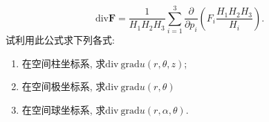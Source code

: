 \begin{enumerate}
$$\mathrm{div}\bm{F}=\frac{1}{H_1H_2H_3}\sum\limits_{i=1}^{3}\frac{\partial }{\partial p_i}(F_i\frac{H_1H_2H_3}{H_i}).$$
试利用此公式求下列各式:
\begin{enumerate}
	\item 在空间柱坐标系, 求$\mathrm{div}\ \mathrm{grad}u(r,\theta,z)$;
	\item 在空间极坐标系, 求$\mathrm{div}\ \mathrm{grad}u(r,\theta)$
	\item 在空间球坐标系, 求$\mathrm{div}\ \mathrm{grad}u(r,\alpha,\theta)$.
\end{enumerate} 
\end{enumerate}